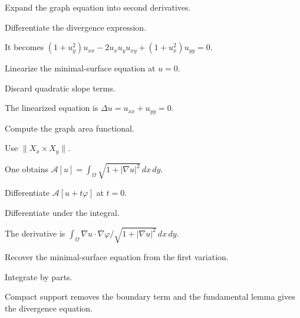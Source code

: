 \begin{exercise}\label{exr:vii19-07}
Expand the graph equation into second derivatives.
\end{exercise}
\begin{hint}
Differentiate the divergence expression.
\end{hint}
\begin{solution}
It becomes \((1+u_y^2)u_{xx}-2u_xu_yu_{xy}+(1+u_x^2)u_{yy}=0\).
\end{solution}

\begin{exercise}\label{exr:vii19-08}
Linearize the minimal-surface equation at \(u=0\).
\end{exercise}
\begin{hint}
Discard quadratic slope terms.
\end{hint}
\begin{solution}
The linearized equation is \(\Delta u=u_{xx}+u_{yy}=0\).
\end{solution}

\begin{exercise}\label{exr:vii19-09}
Compute the graph area functional.
\end{exercise}
\begin{hint}
Use \(\|X_x\times X_y\|\).
\end{hint}
\begin{solution}
One obtains \(\mathcal A[u]=\int_\Omega\sqrt{1+|\nabla u|^2}\,dx\,dy\).
\end{solution}

\begin{exercise}\label{exr:vii19-10}
Differentiate \(\mathcal A[u+t\varphi]\) at \(t=0\).
\end{exercise}
\begin{hint}
Differentiate under the integral.
\end{hint}
\begin{solution}
The derivative is \(\int_\Omega \nabla u\cdot\nabla\varphi/\sqrt{1+|\nabla u|^2}\,dx\,dy\).
\end{solution}

\begin{exercise}\label{exr:vii19-11}
Recover the minimal-surface equation from the first variation.
\end{exercise}
\begin{hint}
Integrate by parts.
\end{hint}
\begin{solution}
Compact support removes the boundary term and the fundamental lemma gives the divergence equation.
\end{solution}

